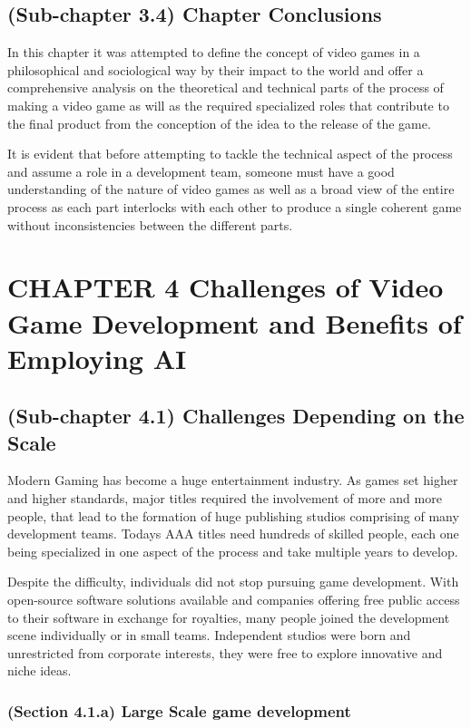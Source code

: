 \documentclass[a4paper,one side,12pt]{book}
\begin{document}
\section{(Sub-chapter 3.4) Chapter Conclusions}

In this chapter it was attempted to define the concept of video games in
a philosophical and sociological way by their impact to the world and
offer a comprehensive analysis on the theoretical and technical parts of
the process of making a video game as will as the required specialized
roles that contribute to the final product from the conception of the
idea to the release of the game.

It is evident that before attempting to tackle the technical aspect of
the process and assume a role in a development team, someone must have a
good understanding of the nature of video games as well as a broad view
of the entire process as each part interlocks with each other to produce
a single coherent game without inconsistencies between the different
parts.

\pagebreak

\chapter{CHAPTER 4 Challenges of Video Game Development and Benefits of Employing AI}


\section{(Sub-chapter 4.1) Challenges Depending on the Scale}

Modern Gaming has become a huge entertainment industry. As games set
higher and higher standards, major titles required the involvement of
more and more people, that lead to the formation of huge publishing
studios comprising of many development teams. Todays AAA titles need
hundreds of skilled people, each one being specialized in one aspect of the process and take multiple years to develop.

Despite the difficulty, individuals did not stop pursuing game
development. With open-source software solutions available and companies
offering free public access to their software in exchange for royalties,
many people joined the development scene individually or in small teams.
Independent studios were born and unrestricted from corporate interests,
they were free to explore innovative and niche ideas.

\subsection{(Section 4.1.a) Large Scale game development}
\end{document}
